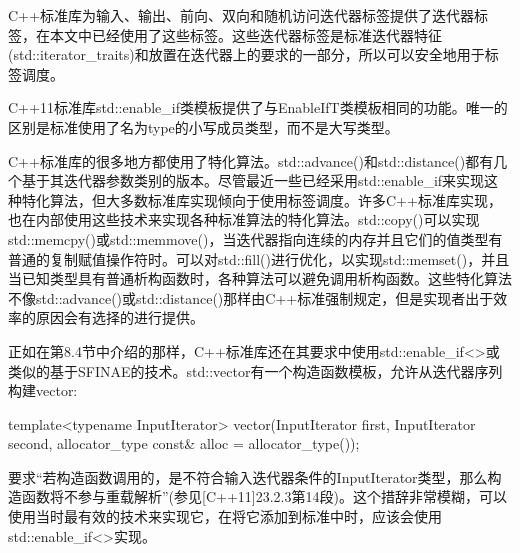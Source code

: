 C++标准库为输入、输出、前向、双向和随机访问迭代器标签提供了迭代器标签，在本文中已经使用了这些标签。这些迭代器标签是标准迭代器特征(std::iterator\_traits)和放置在迭代器上的要求的一部分，所以可以安全地用于标签调度。

C++11标准库std::enable\_if类模板提供了与EnableIfT类模板相同的功能。唯一的区别是标准使用了名为type的小写成员类型，而不是大写类型。

C++标准库的很多地方都使用了特化算法。std::advance()和std::distance()都有几个基于其迭代器参数类别的版本。尽管最近一些已经采用std::enable\_if来实现这种特化算法，但大多数标准库实现倾向于使用标签调度。许多C++标准库实现，也在内部使用这些技术来实现各种标准算法的特化算法。std::copy()可以实现std::memcpy()或std::memmove()，当迭代器指向连续的内存并且它们的值类型有普通的复制赋值操作符时。可以对std::fill()进行优化，以实现std::memset()，并且当已知类型具有普通析构函数时，各种算法可以避免调用析构函数。这些特化算法不像std::advance()或std::distance()那样由C++标准强制规定，但是实现者出于效率的原因会有选择的进行提供。

正如在第8.4节中介绍的那样，C++标准库还在其要求中使用std::enable\_if<>或类似的基于SFINAE的技术。std::vector有一个构造函数模板，允许从迭代器序列构建vector:

\begin{cpp}
template<typename InputIterator>
vector(InputIterator first, InputIterator second,
		allocator_type const& alloc = allocator_type());
\end{cpp}

要求“若构造函数调用的，是不符合输入迭代器条件的InputIterator类型，那么构造函数将不参与重载解析”(参见[C++11]23.2.3第14段)。这个措辞非常模糊，可以使用当时最有效的技术来实现它，在将它添加到标准中时，应该会使用std::enable\_if<>实现。
























